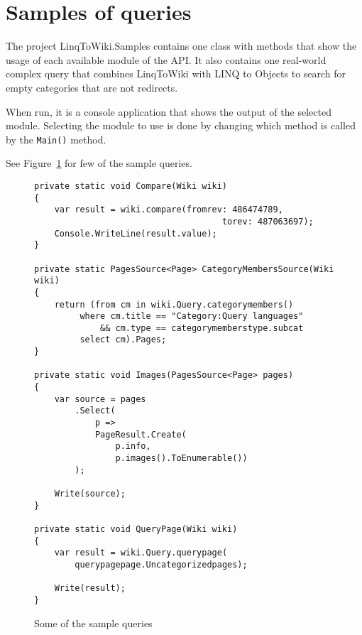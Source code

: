 \section{Samples of queries}

The project LinqToWiki.Samples contains one class with methods
that show the usage of each available module of the \ac{API}.
It also contains one real-world complex query that combines LinqToWiki with LINQ to Objects
to search for empty categories that are not redirects.

When run, it is a console application that shows the output of the selected module.
Selecting the module to use is done by changing which method is called by the \lstinline{Main()} method.

See Figure~\ref{query-samples} for few of the sample queries.

\begin{figure}[htbp]

\begin{lstlisting}
private static void Compare(Wiki wiki)
{
	var result = wiki.compare(fromrev: 486474789,
                                     torev: 487063697);
	Console.WriteLine(result.value);
}

private static PagesSource<Page> CategoryMembersSource(Wiki wiki)
{
	return (from cm in wiki.Query.categorymembers()
		 where cm.title == "Category:Query languages"
		     && cm.type == categorymemberstype.subcat
		 select cm).Pages;
}

private static void Images(PagesSource<Page> pages)
{
	var source = pages
		.Select(
			p =>
			PageResult.Create(
				p.info,
				p.images().ToEnumerable())
		);

	Write(source);
}

private static void QueryPage(Wiki wiki)
{
	var result = wiki.Query.querypage(
		querypagepage.Uncategorizedpages);

	Write(result);
}        
\end{lstlisting}

\caption{Some of the sample queries}
\label{query-samples}
\end{figure}